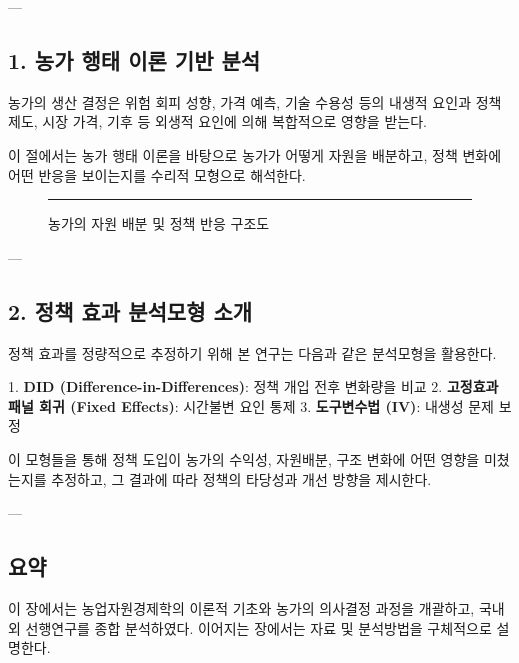 ---

\subsection{1. 농가 행태 이론 기반 분석}

농가의 생산 결정은 위험 회피 성향, 가격 예측, 기술 수용성 등의 내생적 요인과  
정책 제도, 시장 가격, 기후 등 외생적 요인에 의해 복합적으로 영향을 받는다.

이 절에서는 농가 행태 이론을 바탕으로 농가가 어떻게 자원을 배분하고,  
정책 변화에 어떤 반응을 보이는지를 수리적 모형으로 해석한다.

\begin{figure}[htbp]
  \centering
  \rule{0.75\linewidth}{5cm}
  \caption{농가의 자원 배분 및 정책 반응 구조도}\label{fig:chapter2_2}
\end{figure}

---

\subsection{2. 정책 효과 분석모형 소개}

정책 효과를 정량적으로 추정하기 위해 본 연구는 다음과 같은 분석모형을 활용한다.

1. \textbf{DID (Difference-in-Differences)}: 정책 개입 전후 변화량을 비교  
2. \textbf{고정효과 패널 회귀 (Fixed Effects)}: 시간불변 요인 통제  
3. \textbf{도구변수법 (IV)}: 내생성 문제 보정

이 모형들을 통해 정책 도입이 농가의 수익성, 자원배분, 구조 변화에 어떤 영향을 미쳤는지를 추정하고,  
그 결과에 따라 정책의 타당성과 개선 방향을 제시한다.


---

\subsection{요약}

이 장에서는 농업자원경제학의 이론적 기초와 농가의 의사결정 과정을 개괄하고,  
국내외 선행연구를 종합 분석하였다. 이어지는 장에서는 자료 및 분석방법을 구체적으로 설명한다.

